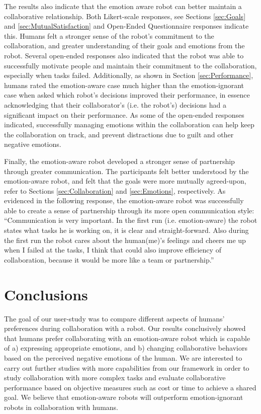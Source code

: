 \documentclass[12pt]{report}
\begin{document}
The results also indicate that the emotion aware robot can better maintain a
collaborative relationship. Both Likert-scale responses, see Sections \ref{sec:Goals}
and \ref{sec:MutualSatisfaction} and Open-Ended Questionnaire responses indicate
this. Humans felt a stronger sense of the robot's commitment to the
collaboration, and greater understanding of their goals and emotions from the
robot. Several open-ended responses also indicated that the robot was able to
successfully motivate people and maintain their commitment to the collaboration,
especially when tasks failed. Additionally, as shown in Section \ref{sec:Performance},
humans rated the emotion-aware case much higher than the emotion-ignorant case
when asked which robot's decisions improved their performance, in essence
acknowledging that their collaborator's (i.e. the robot's) decisions had a
significant impact on their performance. As some of the open-ended responses
indicated, successfully managing emotions within the collaboration can help keep
the collaboration on track, and prevent distractions due to guilt and other
negative emotions.

Finally, the emotion-aware robot developed a stronger sense of  partnership
through greater communication. The participants felt better understood by the
emotion-aware robot, and felt that the goals were more mutually agreed-upon,
refer to Sections \ref{sec:Collaboration} and \ref{sec:Emotions}, respectively. As
evidenced in the following response, the emotion-aware robot was successfully
able to create a sense of partnership through its more open communication style:
``Communication is very important. In the first run (i.e. emotion-aware) the
robot states what tasks he is working on, it is clear and straight-forward. Also
during the first run the robot cares about the human(me)'s feelings and cheers
me up when I failed at the tasks, I think that could also improve efficiency of
collaboration, because it would be more like a team or partnership.''

\section{Conclusions}
The goal of our user-study was to compare different aspects of humans'
preferences during collaboration with a robot. Our results conclusively showed
that humans prefer collaborating with an emotion-aware robot which is capable
of a) expressing appropriate emotions, and b) changing collaborative behaviors
based on the perceived negative emotions of the human. We are interested to
carry out further studies with more capabilities from our framework in order to
study collaboration with more complex tasks and evaluate collaborative
performance based on objective measures such as cost or time to achieve a shared
goal. We believe that emotion-aware robots will outperform emotion-ignorant
robots in collaboration with humans.
\end{document}
